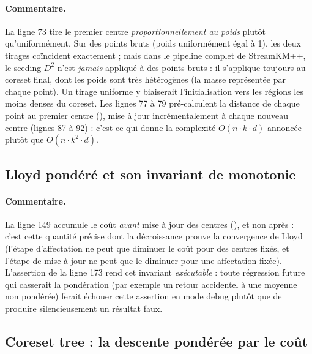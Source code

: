 \paragraph{Commentaire.} La ligne 73 tire le premier centre
\emph{proportionnellement au poids} plutôt qu'uniformément. Sur des points
bruts (poids uniformément égal à 1), les deux tirages coïncident exactement ;
mais dans le pipeline complet de StreamKM++, le seeding $D^2$ n'est
\emph{jamais} appliqué à des points bruts : il s'applique toujours au
coreset final, dont les poids sont très hétérogènes (la masse représentée
par chaque point). Un tirage uniforme y biaiserait l'initialisation vers les
régions les moins denses du coreset. Les lignes 77 à 79 pré-calculent la
distance de chaque point au premier centre (), mise à jour
incrémentalement à chaque nouveau centre (lignes 87 à 92) : c'est ce qui
donne la complexité $O(n\cdot k\cdot d)$ annoncée plutôt que
$O(n\cdot k^2\cdot d)$.

\subsection{Lloyd pondéré et son invariant de monotonie}



\paragraph{Commentaire.} La ligne 149 accumule le coût \emph{avant} mise à
jour des centres (), et non après : c'est cette quantité
précise dont la décroissance prouve la convergence de Lloyd (l'étape
d'affectation ne peut que diminuer le coût pour des centres fixés, et l'étape
de mise à jour ne peut que le diminuer pour une affectation fixée).
L'assertion de la ligne 173 rend cet invariant \emph{exécutable} : toute
régression future qui casserait la pondération (par exemple un retour
accidentel à une moyenne non pondérée) ferait échouer cette assertion en
mode debug plutôt que de produire silencieusement un résultat faux.

\subsection{Coreset tree : la descente pondérée par le coût}

